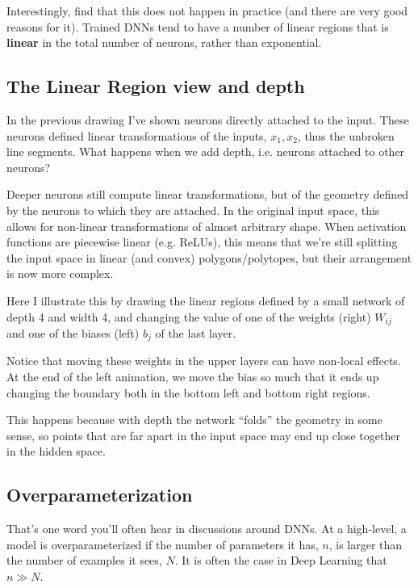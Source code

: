 Interestingly, \citet{hanin2019deep} find that this does not happen in practice (and there are very good reasons for it). Trained DNNs tend to have a number of linear regions that is \textbf{linear} in the total number of neurons, rather than exponential.

\subsection{The Linear Region view and depth}

In the previous drawing I've shown neurons directly attached to the input. These neurons defined linear transformations of the inputs, $x_1, x_2$, thus the unbroken line segments. What happens when we add depth, i.e. neurons attached to other neurons?

Deeper neurons still compute linear transformations, but of the geometry defined by the neurons to which they are attached. In the original input space, this allows for non-linear transformations of almost arbitrary shape. When activation functions are piecewise linear (e.g. ReLUs), this means that we're still splitting the input space in linear (and convex) polygons/polytopes, but their arrangement is now more complex.

Here I illustrate this by drawing the linear regions defined by a small network of depth 4 and width 4, and changing the value of one of the weights (right) $W_{ij}$ and one of the biases (left) $b_j$ of the last layer.


Notice that moving these weights in the upper layers can have non-local effects. At the end of the left animation, we move the bias so much that it ends up changing the boundary both in the bottom left and bottom right regions.

This happens because with depth the network ``folds'' the geometry in some sense, so points that are far apart in the input space may end up close together in the hidden space.

\subsection{Overparameterization}

That's one word you'll often hear in discussions around DNNs. At a high-level, a model is overparameterized if the number of parameters it has, $n$, is larger than the number of examples it sees, $N$. It is often the case in Deep Learning that $n \gg N$.

